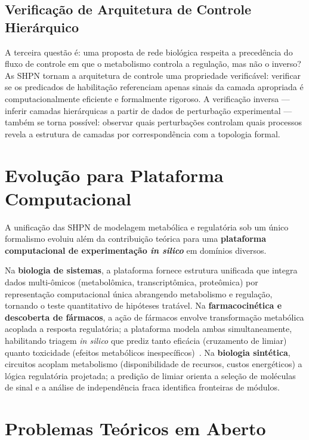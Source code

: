 \subsection{Verificação de Arquitetura de Controle Hierárquico}

A terceira questão é: uma proposta de rede biológica respeita a precedência do
fluxo de controle em que o metabolismo controla a regulação, mas não o inverso?
As SHPN tornam a arquitetura de controle uma propriedade verificável: verificar
se os predicados de habilitação referenciam apenas sinais da camada
apropriada é computacionalmente eficiente e formalmente rigoroso.
A verificação inversa — inferir camadas hierárquicas a partir de dados de
perturbação experimental — também se torna possível: observar quais
perturbações controlam quais processos revela a estrutura de camadas por
correspondência com a topologia formal.

\section{Evolução para Plataforma Computacional}
\label{sec:evolucao-plataforma}

A unificação das SHPN de modelagem metabólica e regulatória sob um único
formalismo evoluiu além da contribuição teórica para uma \textbf{plataforma
computacional de experimentação \textit{in silico}} em domínios diversos.

Na \textbf{biologia de sistemas}, a plataforma fornece estrutura unificada que
integra dados multi-ômicos (metabolômica, transcriptômica, proteômica) por
representação computacional única abrangendo metabolismo e regulação, tornando
o teste quantitativo de hipóteses tratável.
Na \textbf{farmacocinética e descoberta de fármacos}, a ação de fármacos envolve
transformação metabólica acoplada a resposta regulatória; a plataforma modela
ambas simultaneamente, habilitando triagem \textit{in silico} que prediz tanto
eficácia (cruzamento de limiar) quanto toxicidade (efeitos metabólicos
inespecíficos)~\cite{Simao2026EmergentThreshold}.
Na \textbf{biologia sintética}, circuitos acoplam metabolismo (disponibilidade
de recursos, custos energéticos) a lógica regulatória projetada; a predição de
limiar orienta a seleção de moléculas de sinal e a análise de independência
fraca identifica fronteiras de módulos.

\section{Problemas Teóricos em Aberto}
\label{sec:problemas-abertos}

